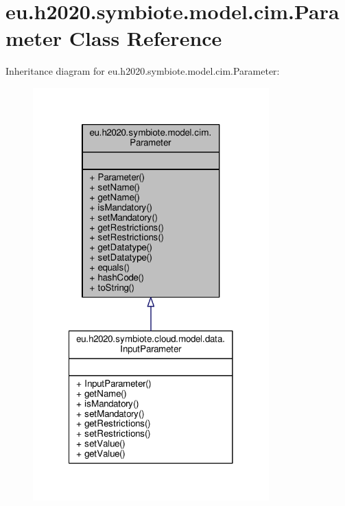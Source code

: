 \hypertarget{classeu_1_1h2020_1_1symbiote_1_1model_1_1cim_1_1Parameter}{}\section{eu.\+h2020.\+symbiote.\+model.\+cim.\+Parameter Class Reference}
\label{classeu_1_1h2020_1_1symbiote_1_1model_1_1cim_1_1Parameter}


Inheritance diagram for eu.\+h2020.\+symbiote.\+model.\+cim.\+Parameter\+:
\nopagebreak
\begin{figure}[H]
\begin{center}
\leavevmode
\includegraphics[width=258pt]{classeu_1_1h2020_1_1symbiote_1_1model_1_1cim_1_1Parameter__inherit__graph}
\end{center}
\end{figure}



